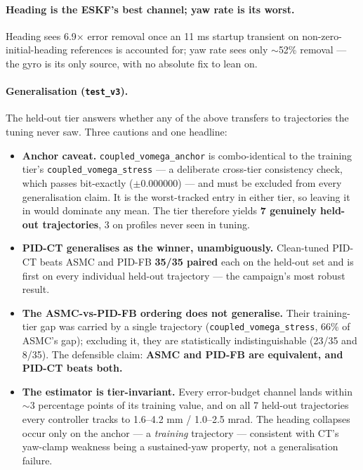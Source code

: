 \documentclass[11pt]{article}
\begin{document}
\paragraph{Heading is the ESKF's best channel; yaw rate is its worst.} Heading sees
6.9$\times$ error removal once an 11 ms startup transient on
non-zero-initial-heading references is accounted for; yaw rate sees only $\sim$52\%
removal --- the gyro is its only source, with no absolute fix to lean on.

\paragraph{Generalisation (\texttt{test\_v3}).} The held-out tier answers whether any of
the above transfers to trajectories the tuning never saw. Three cautions and one
headline:
\begin{itemize}[nosep]
\item \textbf{Anchor caveat.} \texttt{coupled\_vomega\_anchor} is combo-identical to the
      training tier's \texttt{coupled\_vomega\_stress} --- a deliberate cross-tier
      consistency check, which passes bit-exactly ($\pm0.000000$) --- and must be
      excluded from every generalisation claim. It is the worst-tracked entry in either
      tier, so leaving it in would dominate any mean. The tier therefore yields
      \textbf{7 genuinely held-out trajectories}, 3 on profiles never seen in tuning.
\item \textbf{PID-CT generalises as the winner, unambiguously.} Clean-tuned PID-CT beats
      ASMC and PID-FB \textbf{35/35 paired} each on the held-out set and is first on
      every individual held-out trajectory --- the campaign's most robust result.
\item \textbf{The ASMC-vs-PID-FB ordering does not generalise.} Their training-tier gap
      was carried by a single trajectory (\texttt{coupled\_vomega\_stress}, 66\% of
      ASMC's gap); excluding it, they are statistically indistinguishable (23/35 and
      8/35). The defensible claim: \textbf{ASMC and PID-FB are equivalent, and PID-CT
      beats both.}
\item \textbf{The estimator is tier-invariant.} Every error-budget channel lands within
      $\sim$3 percentage points of its training value, and on all 7 held-out
      trajectories every controller tracks to 1.6--4.2 mm / 1.0--2.5 mrad. The heading
      collapses occur only on the anchor --- a \emph{training} trajectory --- consistent
      with CT's yaw-clamp weakness being a sustained-yaw property, not a generalisation
      failure.
\end{itemize}
\end{document}
